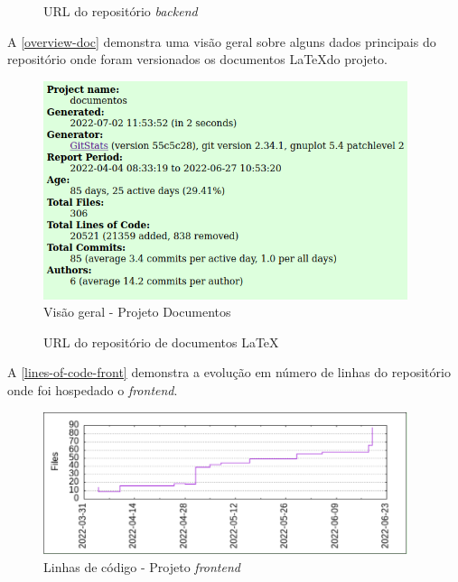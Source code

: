 \begin{figure}[htb]
	\caption{\label{qr-url-back}URL do repositório \textit{\gls{backend}}}
	\begin{center}
	\end{center}
\end{figure}

A \autoref{overview-doc} demonstra uma visão geral sobre alguns dados principais do repositório onde foram versionados os documentos \LaTeX do projeto.

\begin{figure}[H]
	\centering
	\caption{\label{overview-doc}Visão geral - Projeto Documentos}
	\includegraphics[width=0.95\textwidth]{../imagens/stats/overview-documentos.png}
\end{figure}

\begin{figure}[htb]
	\caption{\label{qr-url-doc}URL do repositório de documentos \LaTeX}
	\begin{center}
	\end{center}
\end{figure}

A \autoref{lines-of-code-front} demonstra a evolução em número de linhas do repositório onde foi hospedado o \textit{\gls{frontend}}.
\begin{figure}[H]
	\centering
	\caption{\label{lines-of-code-front}Linhas de código - Projeto \textit{\gls{frontend}}}
	\includegraphics[width=0.95\textwidth]{../imagens/stats/lines-of-code-frontend.png}
\end{figure}

